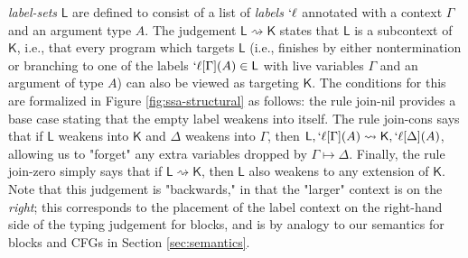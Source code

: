 \documentclass[acmsmall,screen,review]{acmart}
\newcommand{\ms}[1]{\ensuremath{\mathsf{#1}}}
\newcommand{\lbl}[1]{{`#1}}
\newcommand{\cwk}[2]{#1 \mapsto #2}
\newcommand{\lwk}[2]{#1 \rightsquigarrow #2}
\newcommand{\lhyp}[3]{#1[#2](#3)}
\newcommand{\llhyp}[3]{\lhyp{\lbl{#1}}{#2}{#3}}
\newcommand{\rle}[1]{{\scriptsize\textsf{#1}}}
\begin{document}
\textit{label-sets} \(\ms{L}\) are defined to consist of a list of
\textit{labels} \(\lbl{\ell}\) annotated with a context \(\Gamma\) and an
argument type \(A\). The judgement \(\lwk{\ms{L}}{\ms{K}}\) states that
\(\ms{L}\) is a subcontext of \(\ms{K}\), i.e., that every program which targets
\(\ms{L}\) (i.e., finishes by either nontermination or branching to one of the
labels \(\llhyp{\ell}{\Gamma}{A} \in \ms{L}\) with live variables \(\Gamma\) and
an argument of type \(A\)) can also be viewed as targeting \(\ms{K}\). The
conditions for this are formalized in Figure \ref{fig:ssa-structural} as
follows: the rule \rle{join-nil} provides a base case stating that the empty
label weakens into itself. The rule \rle{join-cons} says that if \(\ms{L}\)
weakens into \(\ms{K}\) and \(\Delta\) weakens into \(\Gamma\), then
\(\lwk{\ms{L}, \llhyp{\ell}{\Gamma}{A}}{\ms{K}, \llhyp{\ell}{\Delta}{A}}\),
allowing us to "forget" any extra variables dropped by \(\cwk{\Gamma}{\Delta}\).
Finally, the rule \rle{join-zero} simply says that if \(\lwk{\ms{L}}{\ms{K}}\),
then \(\ms{L}\) also weakens to any extension of \(\ms{K}\). Note that this
judgement is "backwards," in that the "larger" context is on the \textit{right};
this corresponds to the placement of the label context on the right-hand side of
the typing judgement for blocks, and is by analogy to our semantics for blocks
and CFGs in Section \ref{sec:semantics}.
\end{document}
